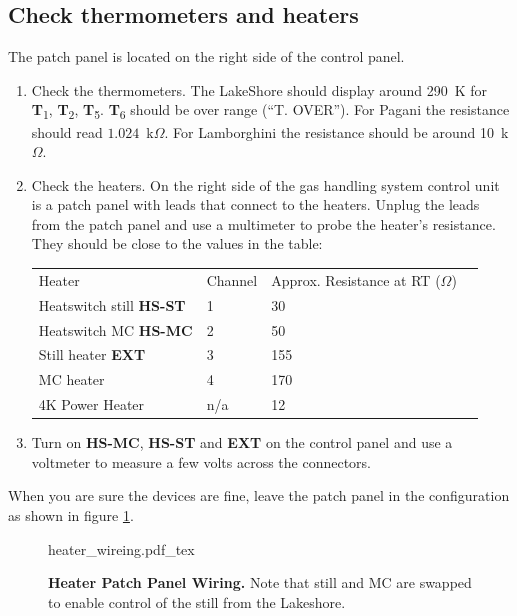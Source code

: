 \documentclass{article}[18pt,A4]
\newcommand{\thing}[1]{{\color{gray}\textsc{ \textbf{#1}}}}
\newcommand{\temperature}[1]{{\color{temperaturecolor}\textbf{T}\textsubscript{#1}}}
\begin{document}
\subsection{Check thermometers and heaters}
The patch panel is located on the right side of the control panel.
\begin{enumerate}
    \item Check the thermometers. The LakeShore should display around 290~K for \temperature{1}, \temperature{2}, \temperature{5}.
    \temperature{6} should be over range (``T. OVER'').
For Pagani the resistance should read $1.024$~k$\Omega$.
For Lamborghini the resistance should be around 10~k$\Omega$.
    \item Check the heaters.
    On the right side of the gas handling system control unit is a patch panel with leads that connect to the heaters.
    Unplug the leads from the patch panel and use a multimeter to probe the heater's resistance. 
    They should be close to the values in the table: 

        \begin{tabular}{llll}
        \color{subsectioncolor} Heater  & \color{subsectioncolor} Channel & \color{subsectioncolor} Approx. Resistance at RT ($\Omega$) \\[0.2em]
        Heatswitch still \thing{HS-ST} & 1       & 30                                                 \\
        Heatswitch MC \thing{HS-MC}    & 2       & 50                                                 \\
        Still heater \thing{EXT}       & 3       & 155                                                \\
        MC heater                      & 4       & 170                                                \\
        4K Power Heater                & n/a     & 12                                                 
        \end{tabular}
    
    \item Turn on \thing{HS-MC}, \thing{HS-ST} and \thing{EXT} on the control panel and use a voltmeter to measure a few volts across the connectors.
    
    
\end{enumerate}
When you are sure the devices are fine, leave the patch panel in the configuration as shown in figure \ref{fig:heater_wireing}.


\begin{figure}[h]
\centering
{heater_wireing.pdf_tex}
\caption{\textbf{Heater Patch Panel Wiring.}
Note that still and MC are swapped to enable control of the still from the Lakeshore.
\label{fig:heater_wireing}
}
\end{figure}
\end{document}
